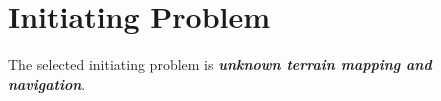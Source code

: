 \section{Initiating Problem}
The selected initiating problem is \textbf{\textit{unknown terrain mapping and navigation}}.